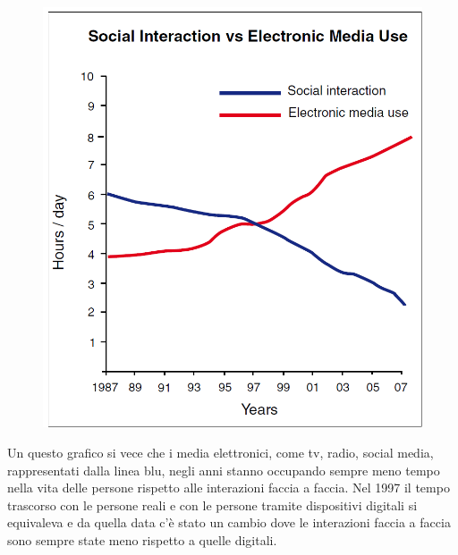 \documentclass[12pt]{book} %
\begin{document}
\begin{mdframed}[linewidth=1pt]
\begin{figure}
  \includegraphics[width=0.95\linewidth]{images/Libro-img056.png}
\end{figure}

Un questo grafico si vece che i media elettronici, come tv, radio, social media, rappresentati dalla linea blu, negli anni stanno occupando sempre meno tempo nella vita delle persone rispetto alle interazioni faccia a faccia. Nel 1997 il tempo trascorso con le persone reali e con le persone tramite dispositivi digitali si equivaleva e da quella data c'è stato un cambio dove le interazioni faccia a faccia sono sempre state meno rispetto a quelle digitali.

\end{mdframed}
\end{document}
